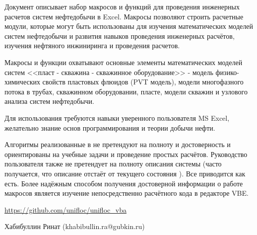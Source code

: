 

Документ описывает набор макросов и функций \unf{} для проведения инженерных расчетов систем нефтедобычи в Excel. Макросы \unf{} позволяют строить расчетные модули, которые могут быть использованы для изучения математических моделей систем нефтедобычи и развития навыков проведения инженерных расчётов, изучения нефтяного инжиниринга и проведения расчетов.

Макросы и функции \unf{} охватывают основные элементы математических моделей систем <<пласт - скважина - скважинное оборудование>> - модель физико-химических свойств пластовых флюидов (PVT модель), модели многофазного потока в трубах, скважинном оборудовании, пласте, модели скважин и узлового анализа систем нефтедобычи.  

Для использования \unf{} требуются навыки уверенного пользователя MS Excel, желательно знание основ программирования и теории добычи нефти. 

Алгоритмы реализованные в  \unf{} не претендуют на полноту и достоверность и ориентированы на учебные задачи и проведение простых расчётов. Руководство пользователя также не претендует на полноту описания системы (часто получается, что описание отстаёт от текущего состояния \unf{}). Все приводится как есть. Более надёжным способом получения достоверной информации о работе макросов \unf{} является изучение непосредственно расчётного кода в редакторе VBE.


\url{https://github.com/unifloc/unifloc_vba}

Хабибуллин Ринат (khabibullin.ra@gubkin.ru)  